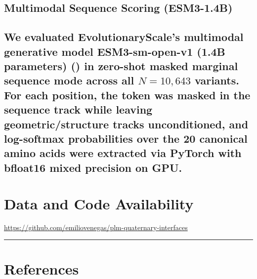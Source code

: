 \documentclass[
  11pt,
  us-letterpaper,
  DIV=11,
  numbers=noendperiod]{scrartcl}
\begin{document}
\subsection{Multimodal Sequence Scoring
(ESM3-1.4B)}\label{multimodal-sequence-scoring-esm3-1.4b}

\subsection{\texorpdfstring{We evaluated EvolutionaryScale's multimodal
generative model ESM3-sm-open-v1 (1.4B parameters)
() in zero-shot
masked marginal sequence mode across all \(N = 10,643\) variants. For
each position, the token was masked in the sequence track while leaving
geometric/structure tracks unconditioned, and log-softmax probabilities
over the 20 canonical amino acids were extracted via PyTorch with
bfloat16 mixed precision on
GPU.}{We evaluated EvolutionaryScale's multimodal generative model ESM3-sm-open-v1 (1.4B parameters) (Hayes et al. 2025) in zero-shot masked marginal sequence mode across all N = 10,643 variants. For each position, the token was masked in the sequence track while leaving geometric/structure tracks unconditioned, and log-softmax probabilities over the 20 canonical amino acids were extracted via PyTorch with bfloat16 mixed precision on GPU.}}\label{we-evaluated-evolutionaryscales-multimodal-generative-model-esm3-sm-open-v1-1.4b-parameters-hayes2024simulating-in-zero-shot-masked-marginal-sequence-mode-across-all-n-10643-variants.-for-each-position-the-token-was-masked-in-the-sequence-track-while-leaving-geometricstructure-tracks-unconditioned-and-log-softmax-probabilities-over-the-20-canonical-amino-acids-were-extracted-via-pytorch-with-bfloat16-mixed-precision-on-gpu.}

\section{Data and Code Availability}\label{sec-availability}

\url{https://github.com/emiliovenegas/plm-quaternary-interfaces}

\begin{center}\rule{0.5\linewidth}{0.5pt}\end{center}

\section*{References}\label{references}
\end{document}
